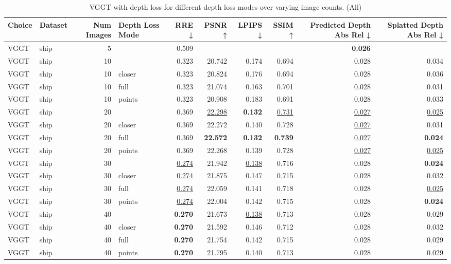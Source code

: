 \begin{table}[H]
\caption{VGGT with depth loss for different depth loss modes over varying image counts. (All)}
\label{tab:05_depth_loss_num_images_all}
\centering
\scriptsize
\begin{tabular}{llrlrrrrrr}
\toprule
Choice & Dataset & Num Images & Depth Loss Mode & RRE ↓ & PSNR ↑ & LPIPS ↓ & SSIM ↑ & Predicted Depth Abs Rel ↓ & Splatted Depth Abs Rel ↓ \\
\midrule
VGGT & ship & 5 &  & 0.509 &  &  &  & \textbf{0.026} &  \\
VGGT & ship & 10 &  & 0.323 & 20.742 & 0.174 & 0.694 & 0.028 & 0.034 \\
VGGT & ship & 10 & closer & 0.323 & 20.824 & 0.176 & 0.694 & 0.028 & 0.036 \\
VGGT & ship & 10 & full & 0.323 & 21.074 & 0.163 & 0.701 & 0.028 & 0.031 \\
VGGT & ship & 10 & points & 0.323 & 20.908 & 0.183 & 0.691 & 0.028 & 0.033 \\
VGGT & ship & 20 &  & 0.369 & \underline{22.298} & \textbf{0.132} & \underline{0.731} & \underline{0.027} & \underline{0.025} \\
VGGT & ship & 20 & closer & 0.369 & 22.272 & 0.140 & 0.728 & \underline{0.027} & 0.031 \\
VGGT & ship & 20 & full & 0.369 & \textbf{22.572} & \textbf{0.132} & \textbf{0.739} & \underline{0.027} & \textbf{0.024} \\
VGGT & ship & 20 & points & 0.369 & 22.268 & 0.139 & 0.728 & \underline{0.027} & \underline{0.025} \\
VGGT & ship & 30 &  & \underline{0.274} & 21.942 & \underline{0.138} & 0.716 & 0.028 & \textbf{0.024} \\
VGGT & ship & 30 & closer & \underline{0.274} & 21.875 & 0.147 & 0.715 & 0.028 & 0.032 \\
VGGT & ship & 30 & full & \underline{0.274} & 22.059 & 0.141 & 0.718 & 0.028 & \underline{0.025} \\
VGGT & ship & 30 & points & \underline{0.274} & 22.004 & 0.142 & 0.715 & 0.028 & \textbf{0.024} \\
VGGT & ship & 40 &  & \textbf{0.270} & 21.673 & \underline{0.138} & 0.713 & 0.028 & 0.029 \\
VGGT & ship & 40 & closer & \textbf{0.270} & 21.592 & 0.146 & 0.712 & 0.028 & 0.032 \\
VGGT & ship & 40 & full & \textbf{0.270} & 21.754 & 0.142 & 0.715 & 0.028 & 0.029 \\
VGGT & ship & 40 & points & \textbf{0.270} & 21.795 & 0.140 & 0.713 & 0.028 & 0.029 \\

\end{tabular}
\end{table}
